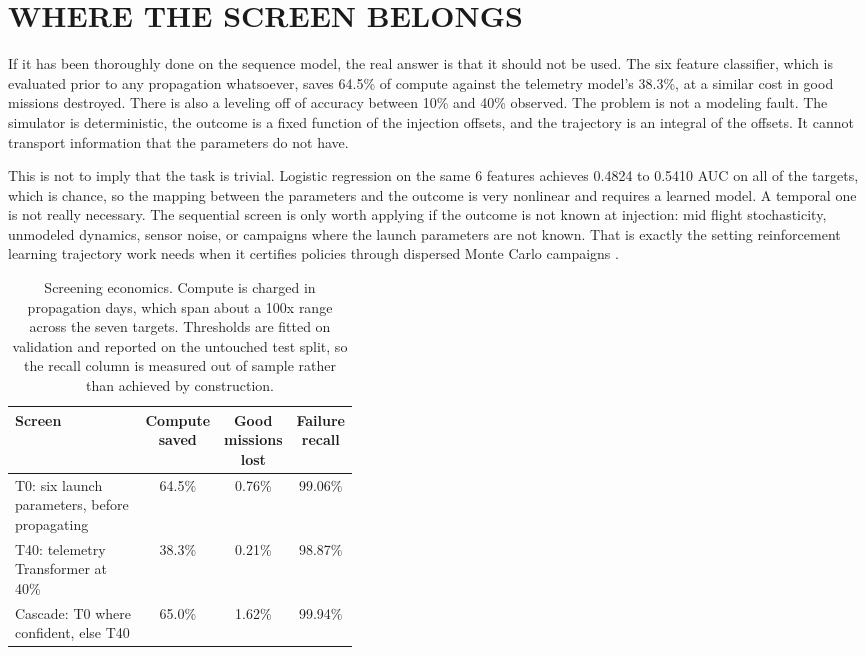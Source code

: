 \documentclass{IEEEtaes}
\begin{document}
\section{WHERE THE SCREEN BELONGS}
\label{sec:screen}

If it has been thoroughly done on the sequence model, the real answer is that it should not be used. The six feature classifier, which is evaluated prior to any propagation whatsoever, saves 64.5\% of compute against the telemetry model's 38.3\%, at a similar cost in good missions destroyed. There is also a leveling off of accuracy between 10\% and 40\% observed. The problem is not a modeling fault. The simulator is deterministic, the outcome is a fixed function of the injection offsets, and the trajectory is an integral of the offsets. It cannot transport information that the parameters do not have.

This is not to imply that the task is trivial. Logistic regression on the same 6 features achieves 0.4824 to 0.5410 AUC on all of the targets, which is chance, so the mapping between the parameters and the outcome is very nonlinear and requires a learned model. A temporal one is not really necessary. The sequential screen is only worth applying if the outcome is not known at injection: mid flight stochasticity, unmodeled dynamics, sensor noise, or campaigns where the launch parameters are not known. That is exactly the setting reinforcement learning trajectory work needs when it certifies policies through dispersed Monte Carlo campaigns \cite{zavoli2021}.

\begin{table}[t]
\centering
\caption{Screening economics. Compute is charged in propagation days, which span about a 100x range across the seven targets. Thresholds are fitted on validation and reported on the untouched test split, so the recall column is measured out of sample rather than achieved by construction.}
\label{tab:economics}
\footnotesize
\setlength{\tabcolsep}{4pt}
\begin{tabular}{@{}p{0.40\linewidth}ccc@{}}
\toprule
Screen & Compute saved & Good missions lost & Failure recall \\
\midrule
T0: six launch parameters, before propagating & 64.5\% & 0.76\% & 99.06\% \\
T40: telemetry Transformer at 40\% & 38.3\% & 0.21\% & 98.87\% \\
Cascade: T0 where confident, else T40 & 65.0\% & 1.62\% & 99.94\% \\
\bottomrule
\end{tabular}
\end{table}
\end{document}
